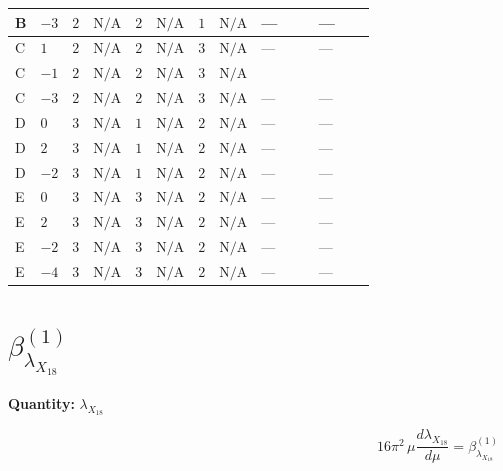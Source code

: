 \documentclass[8pt]{article}
\begin{document}
\begin{landscape}
\begin{longtable}{@{}llcccccc >{\raggedright\arraybackslash}p{0.21\linewidth} >{\raggedright\arraybackslash}p{0.21\linewidth}@{}}
\midrule
B & $-3$ & $2$ & $\text{N/A}$ & $2$ & $\text{N/A}$ & $1$ & $\text{N/A}$ & --- & --- \\
\midrule
C & $1$ & $2$ & $\text{N/A}$ & $2$ & $\text{N/A}$ & $3$ & $\text{N/A}$ & --- & --- \\
\midrule
C & $-1$ & $2$ & $\text{N/A}$ & $2$ & $\text{N/A}$ & $3$ & $\text{N/A}$ & \scriptsize\adjustbox{max width=\linewidth}{$\begin{gathered} +{\lambda_{HS_2}^{(1)}} (4 {\lambda_{X_{17}}^{(1)}}-6 {\lambda_{10}})\end{gathered}$} & \scriptsize\adjustbox{max width=\linewidth}{$\begin{gathered} +{\lambda_{HS_2}^{(A)}} \left({\lambda_{H H^\dagger S_1^\dagger S_2^\dagger}^{\rm Cross}}-\frac{{\lambda_{10}}}{2}+2 {\lambda_{X_{17}}^{(1)}}\right)\end{gathered}$} \\
\midrule
C & $-3$ & $2$ & $\text{N/A}$ & $2$ & $\text{N/A}$ & $3$ & $\text{N/A}$ & --- & --- \\
\midrule
D & $0$ & $3$ & $\text{N/A}$ & $1$ & $\text{N/A}$ & $2$ & $\text{N/A}$ & --- & --- \\
\midrule
D & $2$ & $3$ & $\text{N/A}$ & $1$ & $\text{N/A}$ & $2$ & $\text{N/A}$ & --- & --- \\
\midrule
D & $-2$ & $3$ & $\text{N/A}$ & $1$ & $\text{N/A}$ & $2$ & $\text{N/A}$ & --- & --- \\
\midrule
E & $0$ & $3$ & $\text{N/A}$ & $3$ & $\text{N/A}$ & $2$ & $\text{N/A}$ & --- & --- \\
\midrule
E & $2$ & $3$ & $\text{N/A}$ & $3$ & $\text{N/A}$ & $2$ & $\text{N/A}$ & --- & --- \\
\midrule
E & $-2$ & $3$ & $\text{N/A}$ & $3$ & $\text{N/A}$ & $2$ & $\text{N/A}$ & --- & --- \\
\midrule
E & $-4$ & $3$ & $\text{N/A}$ & $3$ & $\text{N/A}$ & $2$ & $\text{N/A}$ & --- & --- \\
\midrule
\bottomrule
\end{longtable}
\clearpage
\section*{$\beta_{{\lambda_{X_{18}}}}^{(1)}$}
\noindent\textbf{Quantity: }${\lambda_{X_{18}}}$\par\smallskip
\[16\pi^2\,\mu\frac{d {\lambda_{X_{18}}}}{d\mu}=\beta_{{\lambda_{X_{18}}}}^{(1)}\]

\end{landscape}
\end{document}
